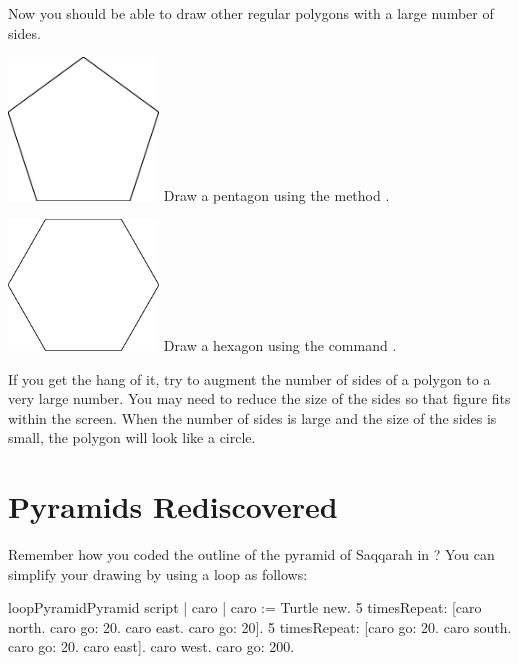 Now you should be able to draw other regular polygons with a large
number of sides.


\begin{exofigwithsize}{\includegraphics[width=4cm]{loopPentagon}} \label{exo:pentagonRepeat}
Draw a pentagon using the method \timesRepeat.
\end{exofigwithsize}

\begin{exofigwithsize}{\includegraphics[width=4cm]{loopHexagon}}\label{exo:hexagonRepeat}
Draw a hexagon using the command \timesRepeat.
\end{exofigwithsize}


If you get the hang of it, try to augment the number of sides of a
polygon to a very large number. You may need to reduce the size of
the sides so that figure fits within the screen. When the
number of sides is large and the size of the sides is small, the
polygon will look like a circle.


\section{Pyramids Rediscovered}\label{sec:bouclonpyramids}
Remember how you coded the outline of the pyramid of Saqqarah in
? You can simplify your drawing by using a loop 
as follows:

\begin{scriptfig}{loopPyramid}{Pyramid script} \label{scr:pyramid}
| caro |
caro := Turtle new.
5 timesRepeat: 
     [caro north.
     caro go: 20.
     caro east.
     caro go: 20].
5 timesRepeat: 
     [caro go: 20.
     caro south.
     caro go: 20.
     caro east].
caro west.
caro go: 200.
\end{scriptfig}

